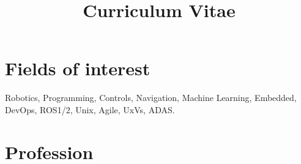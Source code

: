 \documentclass[11pt,a4paper,sans]{moderncv} %
\title{Curriculum Vitae}
\begin{document}
\makecvtitle %
\section{Fields of interest}
Robotics, Programming, Controls, Navigation, Machine Learning, Embedded, DevOps, ROS1/2, Unix, Agile, UxVs, ADAS.
\section{Profession}
\end{document}
